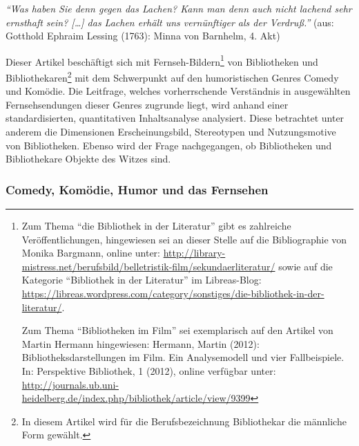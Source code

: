 \begin{small}
\emph{\enquote{Was haben Sie denn gegen das Lachen? Kann man denn auch
nicht lachend sehr ernsthaft sein? {[}\ldots{}{]} das Lachen erhält uns
vernünftiger als der Verdruß.}} (aus: Gotthold Ephraim Lessing (1763):
Minna von Barnhelm, 4. Akt)
\end{small}

\noindent Dieser Artikel beschäftigt sich mit Fernseh-Bildern\footnote{Zum Thema
  \enquote{die Bibliothek in der Literatur} gibt es zahlreiche
  Veröffentlichungen, hingewiesen sei an dieser Stelle auf die
  Bibliographie von Monika Bargmann, online unter:
  \url{http://library-mistress.net/berufsbild/belletristik-film/sekundaerliteratur/} sowie
  auf die Kategorie \enquote{Bibliothek in der Literatur} im
  Libreas-Blog:
  \url{https://libreas.wordpress.com/category/sonstiges/die-bibliothek-in-der-literatur/}.

  Zum Thema \enquote{Bibliotheken im Film} sei exemplarisch auf den
  Artikel von Martin Hermann hingewiesen: Hermann, Martin (2012):
  Bibliotheksdarstellungen im Film. Ein Analysemodell und vier
  Fallbeispiele. In: Perspektive Bibliothek, 1 (2012), online verfügbar
  unter:
  \url{http://journals.ub.uni-heidelberg.de/index.php/bibliothek/article/view/9399}}
von Bibliotheken und Bibliothekaren\footnote{In diesem Artikel wird für
  die Berufsbezeichnung Bibliothekar die männliche Form gewählt.} mit
dem Schwerpunkt auf den humoristischen Genres Comedy und Komödie. Die
Leitfrage, welches vorherrschende Verständnis in ausgewählten
Fernsehsendungen dieser Genres zugrunde liegt, wird anhand einer
standardisierten, quantitativen Inhaltsanalyse analysiert. Diese
betrachtet unter anderem die Dimensionen Erscheinungsbild, Stereotypen
und Nutzungsmotive von Bibliotheken. Ebenso wird der Frage nachgegangen,
ob Bibliotheken und Bibliothekare Objekte des Witzes sind.

\subsubsection{Comedy, Komödie, Humor und das
Fernsehen}\label{comedy-komuxf6die-humor-und-das-fernsehen}

